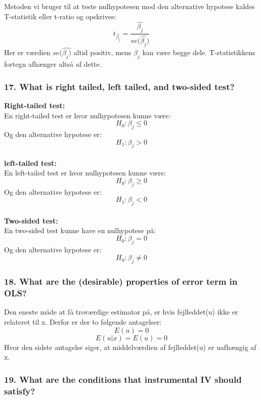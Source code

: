 \documentclass[
  10pt,
]{article}
\begin{document}
Metoden vi bruger til at teste nulhypotesen mod den alternative hypotese
kaldes T-statistik eller t-ratio og opskrives:
\[t_{\hat{\beta_j}}=\frac{\hat{\beta_j}}{se(\hat{\beta_j)}} \] Her er
værdien \(se(\hat{\beta_j)}\) altid positiv, mens \(\beta_j\) kan være
begge dele. T-statistikkens fortegn afhænger altså af dette.

\hypertarget{what-is-right-tailed-left-tailed-and-two-sided-test}{%
\subsubsection{17. What is right tailed, left tailed, and two-sided
test?}\label{what-is-right-tailed-left-tailed-and-two-sided-test}}

\textbf{Right-tailed test:}\\
En right-tailed test er hvor nulhypotesen kunne være:
\[H_0:\beta_j\leq0 \] Og den alternative hypotese er:
\[H_1:\beta_j>0 \]\\
\textbf{left-tailed test:}\\
En left-tailed test er hvor nulhypotesen kunne være:
\[H_0:\beta_j\geq0 \] Og den alternative hypotese er:
\[H_1:\beta_j<0 \]\\
\textbf{Two-sided test:}\\
En two-sided test kunne have en nulhypotese på: \[H_0:\beta_j=0 \] Og
den alternative hypotese er: \[H_0:\beta_j\neq0 \]

\hypertarget{what-are-the-desirable-properties-of-error-term-in-ols}{%
\subsubsection{18. What are the (desirable) properties of error term in
OLS?}\label{what-are-the-desirable-properties-of-error-term-in-ols}}

Den eneste måde at få troværdige estimator på, er hvis fejlleddet(u)
ikke er relateret til x. Derfor er der to følgende antagelser:
\[ E(u)=0\] \[ E(u|x)=E(u)=0\] Hvor den sidste antagelse siger, at
middelværdien af fejlleddet(u) er uafhængig af x.

\hypertarget{what-are-the-conditions-that-instrumental-iv-should-satisfy}{%
\subsubsection{19. What are the conditions that instrumental IV should
satisfy?}\label{what-are-the-conditions-that-instrumental-iv-should-satisfy}}
\end{document}
